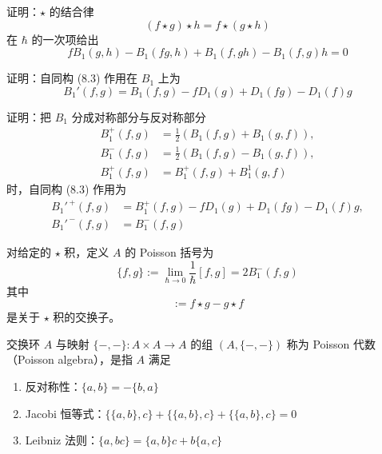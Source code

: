 \begin{exercise}
证明：$\star$ 的结合律
\begin{equation}
    (f\star g)\star h=f\star(g\star h) \tag{8.5}
\end{equation}
在 $\hbar$ 的一次项给出
\begin{equation}
    fB_1(g,h)-B_1(fg,h)+B_1(f,gh)-B_1(f,g)h=0 \tag{8.6}
\end{equation}
\end{exercise}

\begin{exercise}
证明：自同构 (8.3) 作用在 $B_1$ 上为
\begin{equation}
    B_1'(f,g)=B_1(f,g)-fD_1(g)+D_1(fg)-D_1(f)g \tag{8.7}
\end{equation}
\end{exercise}

\begin{exercise}
证明：把 $B_1$ 分成对称部分与反对称部分
\begin{align}
    B_1^+(f,g)&=\frac{1}{2}\left(B_1(f,g)+B_1(g,f)\right), \tag{8.8}\\
    B_1^-(f,g)&=\frac{1}{2}\left(B_1(f,g)-B_1(g,f)\right), \tag{8.9}\\
    B_1^+(f,g)&=B_1^+(f,g)+B_1^1(g,f) \tag{8.10}
\end{align}
时，自同构 (8.3) 作用为
\begin{align}
    B_1'^{\,+}(f,g)&=B_1^+(f,g)-fD_1(g)+D_1(fg)-D_1(f)g, \tag{8.11}\\
    B_1'^{\,-}(f,g)&=B_1^-(f,g) \tag{8.12}
\end{align}
\end{exercise}


对给定的 $\star$ 积，定义 $A$ 的 Poisson 括号为
\begin{equation}
    \{f,g\}:=\lim_{\hbar\to0}\frac{1}{\hbar}[f,g]=2B_1^-(f,g) \tag{8.13}
\end{equation}
其中
\begin{equation}
    [f,g]:=f\star g-g\star f \tag{8.14}
\end{equation}
是关于 $\star$ 积的交换子。

\begin{definition}
交换环 $A$ 与映射 $\{-,-\}\colon A\times A\to A$ 的组 $(A,\{-,-\})$ 称为 Poisson 代数（Poisson algebra），是指 $A$ 满足
\begin{enumerate}
    \item 反对称性：$\{a,b\}=-\{b,a\}$
    \item Jacobi 恒等式：$\{\{a,b\},c\}+\{\{a,b\},c\}+\{\{a,b\},c\}=0$
    \item Leibniz 法则：$\{a,bc\}=\{a,b\}c+b\{a,c\}$
\end{enumerate}
\end{definition}


